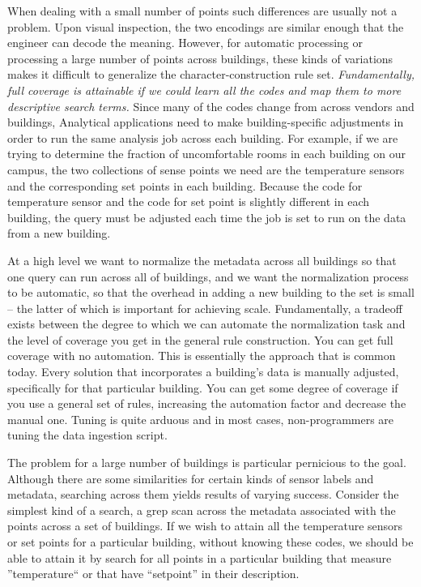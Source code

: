 
When dealing with a small number of points such differences are usually not a problem.  Upon 
visual inspection, the two
encodings are similar enough that the engineer can decode the meaning.  However, for automatic 
processing or processing a large number of points across buildings, these kinds of 
variations makes it difficult to generalize the character-construction rule set.  
\emph{Fundamentally, full coverage is attainable if we could learn all the codes and map
them to more descriptive search terms.}
Since many of the codes change from across vendors and buildings, Analytical applications 
need to make building-specific adjustments in order to run the same analysis job across each
building.  For example, if we are trying to determine the fraction of uncomfortable rooms
in each building on our campus, the two collections of sense points we need are the temperature
sensors and the corresponding set points in each building.  Because the code for temperature
sensor and the code for set point is slightly different in each building, the query
must be adjusted each time the job is set to run on the data from a new building.

At a high level we want to normalize the metadata across all buildings so that one query
can run across all of buildings, and we want the normalization process to be automatic, so that
the overhead in adding a new building to the set is small -- the latter of which is important
for achieving scale.  Fundamentally, a tradeoff exists between the degree to which we can 
automate the normalization task and the level of coverage you get in the general 
rule construction.  You can get full coverage with no automation.  This is essentially the approach
that is common today.  Every solution that incorporates a building's data is manually
adjusted, specifically for that particular building.  You can get some degree of coverage if you
use a general set of rules, increasing the automation factor and decrease the manual one.
Tuning is quite arduous and in most cases, non-programmers are tuning the data ingestion script.

The problem for a large number of buildings is particular pernicious to the goal. Although 
there are some similarities for certain kinds of sensor
labels and metadata, searching across them yields results of varying success.  Consider the 
simplest kind of a search, a grep scan across the metadata associated with the points
across a set of buildings.  If we wish to attain all the temperature sensors or set points
for a particular building, without knowing these codes, we should be able to attain
it by search for all points in a particular building that measure ''temperature`` or
that have ``setpoint'' in their description.

